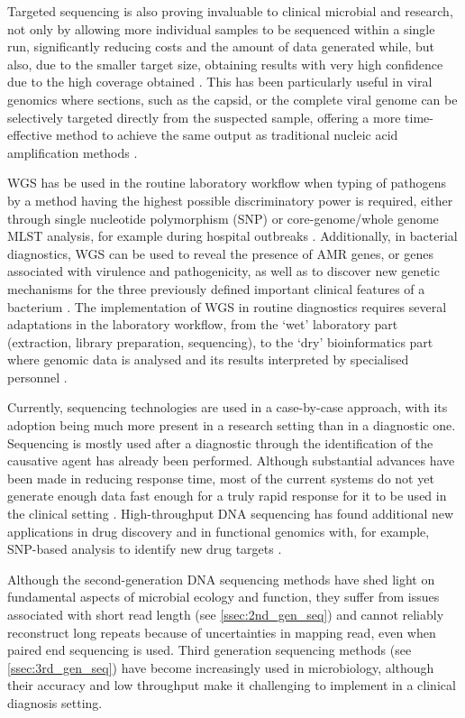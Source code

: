 Targeted sequencing is also proving invaluable to clinical microbial and research, not only by allowing more individual samples to be sequenced within a single run, significantly reducing costs and the amount of data generated while, but also, due to the smaller target size, obtaining results with very high confidence due to the high coverage obtained \citep{goodwin_coming_2016}. This has been particularly useful in viral genomics where sections, such as the capsid, or the complete viral genome can be selectively targeted directly from the suspected sample, offering a more time-effective method to achieve the same output as traditional nucleic acid amplification methods \citep{cassedy_virus_2021}. 

WGS has be used in the routine laboratory workflow when typing of pathogens by a method having the highest possible discriminatory power is required, either through single nucleotide polymorphism (SNP) or core-genome/whole genome MLST analysis, for example during hospital outbreaks \citep{tagini_bacterial_2017}. Additionally, in bacterial diagnostics, WGS can be used to reveal the presence of AMR genes, or genes associated with virulence and pathogenicity, as well as to discover new genetic mechanisms for the three previously defined important clinical features of a bacterium \citep{rossen_practical_2018}. The implementation of WGS in routine diagnostics requires several adaptations in the laboratory workflow, from the ‘wet’ laboratory part (extraction, library preparation, sequencing), to the ‘dry’ bioinformatics part where genomic data is analysed and its results interpreted by specialised personnel \citep{rossen_practical_2018}. 

Currently, sequencing technologies are used in a case-by-case approach, with its adoption being much more present in a research setting than in a diagnostic one. Sequencing is mostly used after a diagnostic through the identification of the causative agent has already been performed. Although substantial advances have been made in reducing response time, most of the current systems do not yet generate enough data fast enough for a truly rapid response for it to be used in the clinical setting \citep{goodwin_coming_2016}. High-throughput DNA sequencing has found additional new applications in drug discovery and in functional genomics with, for example, SNP-based analysis to identify new drug targets \citep{loman_twenty_2015}.

Although the second-generation DNA sequencing methods have shed light on fundamental aspects of microbial ecology and function, they suffer from issues associated with short read length (see \ref{ssec:2nd_gen_seq}) and cannot reliably reconstruct long repeats because of uncertainties in mapping read, even when paired end sequencing is used. Third generation sequencing methods (see \ref{ssec:3rd_gen_seq}) have become increasingly used in microbiology, although their accuracy and low throughput make it challenging to implement in a clinical diagnosis setting. %

